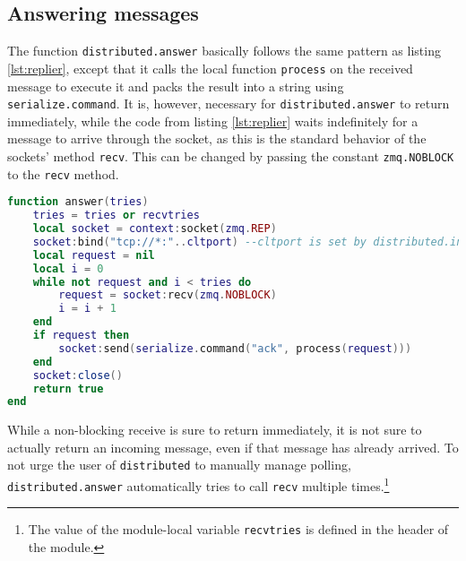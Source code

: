 \subsection{Answering messages}

The function \texttt{distributed.answer} basically follows the same pattern as listing \ref{lst:replier}, except that it calls the local function \texttt{process} on the received message to execute it and packs the result into a string using \texttt{serialize.command}. It is, however, necessary for \texttt{distributed.answer} to return immediately, while the code from listing \ref{lst:replier} waits indefinitely for a message to arrive through the socket, as this is the standard behavior of the sockets' method \texttt{recv}. This can be changed by passing the constant \texttt{zmq.NOBLOCK} to the \texttt{recv} method.

\begin{lstlisting}[language=lua, caption={The function \texttt{answer} of the module \texttt{distributed}}, label=lst:distributedanswer, name=lst:distributedanswer]
function answer(tries)
	tries = tries or recvtries
	local socket = context:socket(zmq.REP)
	socket:bind("tcp://*:"..cltport) --cltport is set by distributed.init
	local request = nil
	local i = 0
	while not request and i < tries do
		request = socket:recv(zmq.NOBLOCK)
		i = i + 1
	end
	if request then
	    socket:send(serialize.command("ack", process(request)))
	end
	socket:close()
	return true
end
\end{lstlisting}

While a non-blocking receive is sure to return immediately, it is not sure to actually return an incoming message, even if that message has already arrived. To not urge the user of \texttt{distributed} to manually manage polling, \texttt{distributed.answer} automatically tries to call \texttt{recv} multiple times.\footnote{The value of the module-local variable \texttt{recvtries} is defined in the header of the module.}
